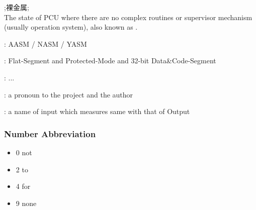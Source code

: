 

;裸金属; \\
The state of PCU where there are no complex routines or supervisor mechanism (usually operation system), also known as .


: AASM / NASM / YASM

: Flat-Segment and Protected-Mode and 32-bit Data\&Code-Segment

: ...

: a pronoun to the project and the author

: a name of input which measures same with that of Output

\subsubsection{Number Abbreviation}
\begin{itemize}
	\item 0 not
	\item 2 to
	\item 4 for
	\item 9 none
\end{itemize}



